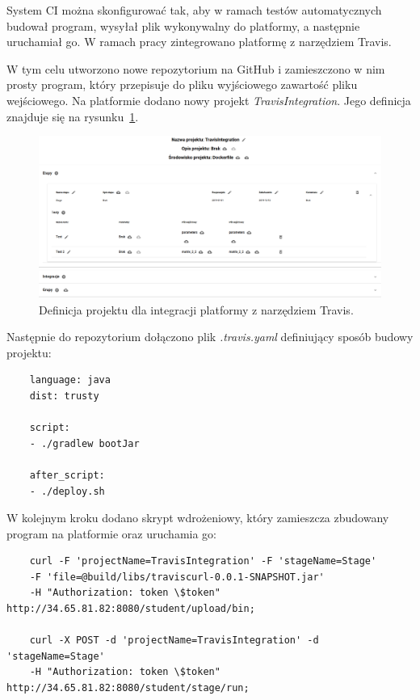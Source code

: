 System CI można skonfigurować tak, aby w ramach testów automatycznych budował program, wysyłał plik wykonywalny do platformy, a następnie uruchamiał go.
W ramach pracy zintegrowano platformę z narzędziem Travis.

W tym celu utworzono nowe repozytorium na GitHub i zamieszczono w nim prosty program, który przepisuje do pliku wyjściowego zawartość pliku wejściowego.
Na platformie dodano nowy projekt \textit{TravisIntegration}.
Jego definicja znajduje się na rysunku~\ref{fig:travis_integration}.

\begin{figure}[h]
    \centering
    \includegraphics[width = 12cm]{chapter05/travis_integration.png}
    \caption{Definicja projektu dla integracji platformy z narzędziem Travis.}
    \label{fig:travis_integration}
\end{figure}

Następnie do repozytorium dołączono plik \textit{.travis.yaml} definiujący sposób budowy projektu:

{\selectfont
\tiny
\begin{lstlisting}
    language: java
    dist: trusty

    script:
    - ./gradlew bootJar

    after_script:
    - ./deploy.sh
\end{lstlisting}
}

W kolejnym kroku dodano skrypt wdrożeniowy, który zamieszcza zbudowany program na platformie oraz uruchamia go:

{\selectfont
\tiny
\begin{lstlisting}
    curl -F 'projectName=TravisIntegration' -F 'stageName=Stage'
    -F 'file=@build/libs/traviscurl-0.0.1-SNAPSHOT.jar'
    -H "Authorization: token \$token" http://34.65.81.82:8080/student/upload/bin;

    curl -X POST -d 'projectName=TravisIntegration' -d 'stageName=Stage'
    -H "Authorization: token \$token" http://34.65.81.82:8080/student/stage/run;
\end{lstlisting}
}

